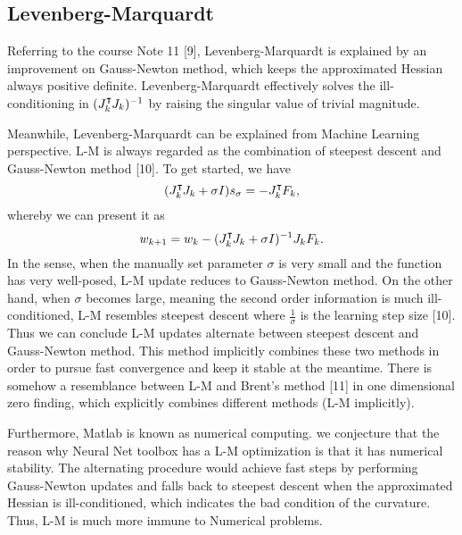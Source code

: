 \documentclass{article} %
\newcommand\transp{^\intercal\kern-\scriptspace}
\begin{document}
\subsection{Levenberg-Marquardt}
Referring to the course Note 11 [9], Levenberg-Marquardt is explained by an improvement on Gauss-Newton method, which keeps the approximated Hessian always positive definite. Levenberg-Marquardt effectively solves the ill-conditioning in $(J_k \transp J_k)^{-1} $ by raising the singular value of trivial magnitude.

Meanwhile, Levenberg-Marquardt can be explained from Machine Learning perspective. L-M is always regarded as the combination of steepest descent and Gauss-Newton method [10]. To get started, we have 
$$
(J_k \transp J_k + \sigma I)s_{\sigma} = -J_k \transp F_k,
$$
whereby we can present it as
$$
w_{k+1} = w_k - (J_k \transp J_k + \sigma I)^{-1}J_k F_k.
$$
In the sense, when the manually set parameter $\sigma$ is very small and the function has very well-posed, L-M update reduces to Gauss-Newton method. On the other hand, when $\sigma$ becomes large, meaning the second order information is much ill-conditioned, L-M resembles steepest descent where $\frac{1}{\sigma}$ is the learning step size [10]. Thus we can conclude L-M updates alternate between steepest descent and Gauss-Newton method. This method implicitly combines these two methods in order to pursue fast convergence and keep it stable at the meantime. There is somehow a resemblance between L-M and Brent's method [11] in one dimensional zero finding, which explicitly combines different methods (L-M implicitly).

Furthermore, Matlab is known as numerical computing. we conjecture that the reason why Neural Net toolbox has a L-M optimization is that it has numerical stability. The alternating procedure would achieve fast steps by performing Gauss-Newton updates and falls back to steepest descent when the approximated Hessian is ill-conditioned, which indicates the bad condition of the curvature. Thus, L-M is much more immune to Numerical problems.
\end{document}

